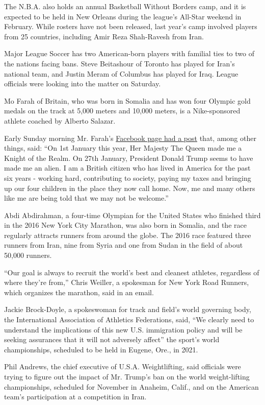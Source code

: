 The N.B.A. also holds an annual Basketball Without Borders camp, and it
is expected to be held in New Orleans during the league's All-Star
weekend in February. While rosters have not been released, last year's
camp involved players from 25 countries, including Amir Reza Shah-Ravesh
from Iran.

Major League Soccer has two American-born players with familial ties to
two of the nations facing bans. Steve Beitashour of Toronto has played
for Iran's national team, and Justin Meram of Columbus has played for
Iraq. League officials were looking into the matter on Saturday.

Mo Farah of Britain, who was born in Somalia and has won four Olympic
gold medals on the track at 5,000 meters and 10,000 meters, is a
Nike-sponsored athlete coached by Alberto Salazar.

Early Sunday morning Mr. Farah's \href{https://t.co/RUqwoTahZq}{Facebook
page had a post} that, among other things, said: ``On 1st January this
year, Her Majesty The Queen made me a Knight of the Realm. On 27th
January, President Donald Trump seems to have made me an alien. I am a
British citizen who has lived in America for the past six years -
working hard, contributing to society, paying my taxes and bringing up
our four children in the place they now call home. Now, me and many
others like me are being told that we may not be welcome.''

Abdi Abdirahman, a four-time Olympian for the United States who finished
third in the 2016 New York City Marathon, was also born in Somalia, and
the race regularly attracts runners from around the globe. The 2016 race
featured three runners from Iran, nine from Syria and one from Sudan in
the field of about 50,000 runners.

``Our goal is always to recruit the world's best and cleanest athletes,
regardless of where they're from,'' Chris Weiller, a spokesman for New
York Road Runners, which organizes the marathon, said in an email.

Jackie Brock-Doyle, a spokeswoman for track and field's world governing
body, the International Association of Athletics Federations, said, ``We
clearly need to understand the implications of this new U.S. immigration
policy and will be seeking assurances that it will not adversely
affect'' the sport's world championships, scheduled to be held in
Eugene, Ore., in 2021.

Phil Andrews, the chief executive of U.S.A. Weightlifting, said
officials were trying to figure out the impact of Mr. Trump's ban on the
world weight-lifting championships, scheduled for November in Anaheim,
Calif., and on the American team's participation at a competition in
Iran.


